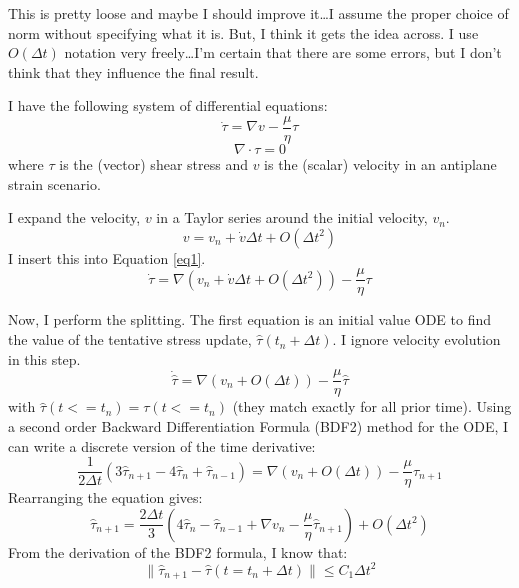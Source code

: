 \documentclass[a4paper]{article}
\begin{document}
This is pretty loose and maybe I should improve it\dots I assume the proper choice of norm without specifying what it is. 
But, I think it gets the idea across. I use $O(\Delta t)$ notation very freely\dots I'm certain that there are some
errors, but I don't think that they influence the final result.

I have the following system of differential equations:
\begin{equation}
    \dot{\tau} = \nabla v - \frac{\mu}{\eta}\tau
    \label{eq1}
\end{equation}
\begin{equation}
    \nabla \cdot \tau = 0
    \label{eq2}
\end{equation}
where $\tau$ is the (vector) shear stress and $v$ is the (scalar) velocity in an
antiplane strain scenario.

I expand the velocity, $v$ in a Taylor series around the initial velocity, $v_n$.
\begin{equation}
    v = v_n + \dot{v}\Delta t + O(\Delta t^2)
    \label{taylorv}
\end{equation}
I insert this into Equation \ref{eq1}.
\begin{equation}
    \dot{\tau} = \nabla (v_n + \dot{v}\Delta t + O(\Delta t^2)) - \frac{\mu}{\eta}\tau
    \label{eq1new}
\end{equation}

Now, I perform the splitting.
The first equation is an initial value ODE to find the value of the tentative stress update, $\hat{\tau}(t_n + \Delta t)$. 
I ignore velocity evolution in this step.
\begin{equation}
    \dot{\hat{\tau}} = \nabla (v_n + O(\Delta t)) - \frac{\mu}{\eta}\hat{\tau}
    \label{split1}
\end{equation}
with $\hat{\tau}(t <= t_n) = \tau(t <= t_n)$ (they match exactly for all prior time).
Using a second order Backward Differentiation Formula (BDF2) method for the ODE, I can write
a discrete version of the time derivative:
\begin{equation}
    \frac{1}{2\Delta t}(3\hat{\tau}_{n+1} - 4\hat{\tau}_n + \hat{\tau}_{n-1}) = \nabla (v_n + O(\Delta t)) - \frac{\mu}{\eta}\hat{\tau}_{n+1}
    \label{split1}
\end{equation}
Rearranging the equation gives:
\begin{equation}
    \hat{\tau}_{n+1} = \frac{2\Delta t}{3}(4\hat{\tau}_n - \hat{\tau}_{n-1} + \nabla v_n - \frac{\mu}{\eta}\hat{\tau}_{n+1}) + O(\Delta t^2)
    \label{split1}
\end{equation}
From the derivation of the BDF2 formula, I know that:
\begin{equation}
    \|\hat{\tau}_{n+1} - \hat\tau(t = t_n + \Delta t)\| \leq C_1\Delta t^2
    \label{BDF2error}
\end{equation}
\end{document}
